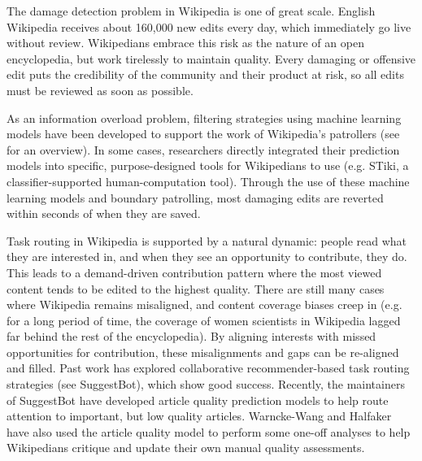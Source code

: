  The damage detection problem in Wikipedia is one of great scale.  English Wikipedia receives about 160,000 new edits every day, which immediately go live without review.  Wikipedians embrace this risk as the nature of an open encyclopedia, but work tirelessly to maintain quality. Every damaging or offensive edit puts the credibility of the community and their product at risk, so all edits must be reviewed as soon as possible\cite{geiger2010work}.

As an information overload problem, filtering strategies using machine learning models have been developed to support the work of Wikipedia's patrollers (see \cite{adler2011wikipedia} for an overview).  In some cases, researchers directly integrated their prediction models into specific, purpose-designed tools for Wikipedians to use (e.g. STiki\cite{west2010stiki}, a classifier-supported human-computation tool). Through the use of these machine learning models and boundary patrolling, most damaging edits are reverted within seconds of when they are saved\cite{geiger2013levee}.

Task routing in Wikipedia is supported by a natural dynamic: people read what they are interested in, and when they see an opportunity to contribute, they do.  This leads to a demand-driven contribution pattern where the most viewed content tends to be edited to the highest quality\cite{hill2014consider}.  There are still many cases where Wikipedia remains misaligned\cite{wang2015misalignment}, and content coverage biases creep in (e.g. for a long period of time, the coverage of women scientists in Wikipedia lagged far behind the rest of the encyclopedia\cite{halfaker2017interpolating}).  By aligning interests with missed opportunities for contribution, these misalignments and gaps can be re-aligned and filled.  Past work has explored collaborative recommender-based task routing strategies (see SuggestBot\cite{cosley2007suggestbot}), which show good success.  Recently, the maintainers of SuggestBot have developed article quality prediction models to help route attention to important, but low quality articles\cite{wang2013tell}.  Warncke-Wang and Halfaker have also used the article quality model to perform some one-off analyses to help Wikipedians critique and update their own manual quality assessments\cite{wang2014screening}.

